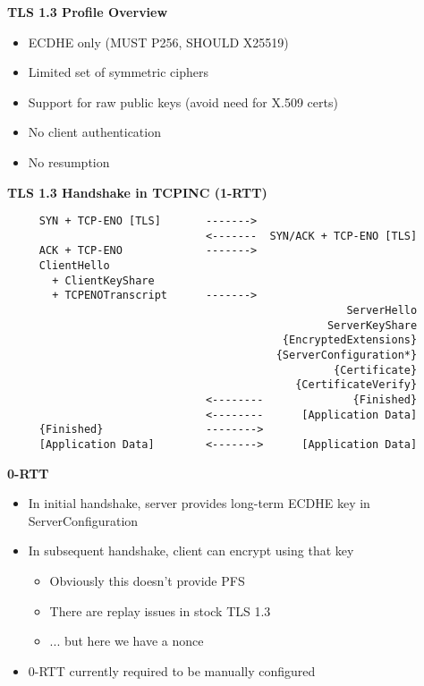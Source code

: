 \documentclass[helvetica]{seminar}
\newcommand{\heading}[1]{%
  \begin{center} 
    \large\bf 
    #1 
  \end{center} 
  \vspace{.4 in}}
\begin{document}
\begin{slide}
\heading{TLS 1.3 Profile Overview}

\begin{itemize}
\item ECDHE only (MUST P256, SHOULD X25519)
\item Limited set of symmetric ciphers
\item Support for raw public keys (avoid need for X.509 certs)
\item No client authentication
\item No resumption
\end{itemize}
\end{slide}

\begin{slide}
\heading{TLS 1.3 Handshake in TCPINC (1-RTT)}

\begin{scriptsize}
\begin{verbatim}
     SYN + TCP-ENO [TLS]       ------->
                               <-------  SYN/ACK + TCP-ENO [TLS]
     ACK + TCP-ENO             ------->
     ClientHello
       + ClientKeyShare
       + TCPENOTranscript      ------->
                                                     ServerHello
                                                  ServerKeyShare
                                           {EncryptedExtensions}
                                          {ServerConfiguration*}
                                                   {Certificate}
                                             {CertificateVerify}
                               <--------              {Finished}
                               <--------      [Application Data]
     {Finished}                -------->
     [Application Data]        <------->      [Application Data]
\end{verbatim}
\end{scriptsize}
\end{slide}


\begin{slide}
\heading{0-RTT}

\begin{itemize}
\item In initial handshake, server provides long-term ECDHE key in ServerConfiguration
\item In subsequent handshake, client can encrypt using that key
  \begin{itemize}
  \item Obviously this doesn't provide PFS
  \item There are replay issues in stock TLS 1.3
  \item ... but here we have a nonce
  \end{itemize}
\item 0-RTT currently required to be manually configured
\end{itemize}

\end{slide}
\end{document}
